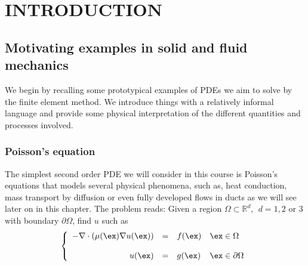 \setchapterpreamble[u]{\margintoc}
\chapter{INTRODUCTION}


\section{Motivating examples in solid and fluid mechanics}

We begin by recalling some prototypical examples of PDEs
we aim to solve by the finite element method.
We introduce things with a relatively informal language
and provide some physical interpretation of the different
quantities and processes involved.

\subsection{Poisson's equation} 

The simplest second order PDE we will consider in this course is
Poisson's equations that models several physical phenomena, such as,
heat conduction, mass transport by diffusion or even
fully developed flows in ducts as we will see later on in this
chapter. The problem reads: Given a region $\Omega \subset \mathbb{R}^d,~~d=1,2$ or $3$
with boundary $\partial{\Omega}$, find $u$ such as
\begin{equation}
\left \{
\begin{array}{rcll}
-\nabla \cdot \left ( \mu(\ex) \nabla{u}(\ex) \right) & = & f(\ex) & \ex \in \Omega \\
& & & \\
u(\ex) & = & g(\ex) & \ex \in \partial{\Omega}
\end{array}
\right.
\end{equation}

